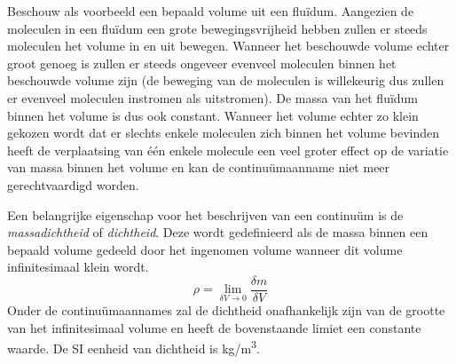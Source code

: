 Beschouw als voorbeeld een bepaald volume uit een fluïdum. Aangezien de moleculen in een fluïdum een grote bewegingsvrijheid hebben zullen er steeds moleculen het volume in en uit bewegen. Wanneer het beschouwde volume echter groot genoeg is zullen er steeds ongeveer evenveel moleculen binnen het beschouwde volume zijn (de beweging van de moleculen is willekeurig dus zullen er evenveel moleculen instromen als uitstromen). De massa van het fluïdum binnen het volume is dus ook constant. Wanneer het volume echter zo klein gekozen wordt dat er slechts enkele moleculen zich binnen het volume bevinden heeft de verplaatsing van één enkele molecule een veel groter effect op de variatie van massa binnen het volume en kan de continuümaanname niet meer gerechtvaardigd worden.

Een belangrijke eigenschap voor het beschrijven van een continuüm is de \emph{massadichtheid} of \emph{dichtheid}. Deze wordt gedefinieerd als de massa binnen een bepaald volume gedeeld door het ingenomen volume wanneer dit volume infinitesimaal klein wordt. 
\begin{equation}
	\rho = \lim_{\delta V \to 0} \frac{\delta m}{\delta V}
	\label{eqn:dichtheid}
\end{equation}
Onder de continuümaannames zal de dichtheid onafhankelijk zijn van de grootte van het infinitesimaal volume en heeft de bovenstaande limiet een constante waarde. De SI eenheid van dichtheid is \unit{kg/m^3}.

